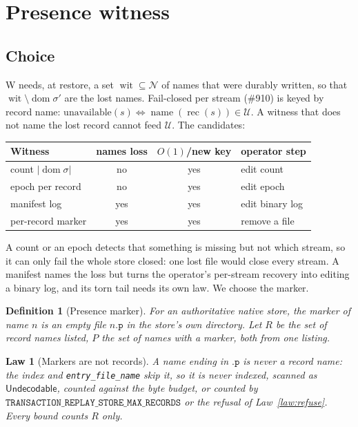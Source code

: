 \documentclass[journal]{IEEEtran}
\newtheorem{definition}{Definition}
\newtheorem{law}{Law}
\newcommand{\Nm}{\mathcal{N}}
\newcommand{\dom}{\operatorname{dom}}
\newcommand{\rec}{\operatorname{rec}}
\newcommand{\wit}{\operatorname{wit}}
\newcommand{\name}{\operatorname{name}}
\newcommand{\Undec}{\mathsf{Undecodable}}
\newcommand{\U}{\mathcal{U}}
\begin{document}
\section{Presence witness}\label{sec:witness}

\subsection{Choice}

W needs, at restore, a set $\wit\subseteq\Nm$ of names that were durably written, so that
$\wit\setminus\dom\sigma'$ are the lost names.  Fail-closed per stream (\#910) is keyed by
record name: $\mathrm{unavailable}(s)\iff\name(\rec(s))\in\U$.  A witness that does not
name the lost record cannot feed $\U$.  The candidates:

\begin{center}
\footnotesize
\begin{tabular}{@{}lccl@{}}
\toprule
Witness & names loss & $O(1)$/new key & operator step\\
\midrule
count $|\dom\sigma|$ & no & yes & edit count\\
epoch per record & no & yes & edit epoch\\
manifest log & yes & yes & edit binary log\\
per-record marker & yes & yes & remove a file\\
\bottomrule
\end{tabular}
\end{center}

A count or an epoch detects that something is missing but not which stream, so it can only
fail the whole store closed: one lost file would close every stream.  A manifest names the
loss but turns the operator's per-stream recovery into editing a binary log, and its torn
tail needs its own law.  We choose the marker.

\begin{definition}[Presence marker]\label{def:marker}
For an authoritative native store, the marker of name $n$ is an empty file $n.\mathtt{p}$ in
the store's own directory.  Let $R$ be the set of record names listed, $P$ the set of names
with a marker, both from one listing.
\end{definition}

\begin{law}[Markers are not records]\label{law:notrecord}
A name ending in $.\mathtt{p}$ is never a record name: the index and
\texttt{entry\_file\_name} skip it, so it is never indexed, scanned as $\Undec$, counted
against the byte budget, or counted by $\mathtt{TRANSACTION\_REPLAY\_STORE\_MAX\_RECORDS}$ or
the refusal of Law~\ref{law:refuse}.  Every bound counts $R$ only.
\end{law}
\end{document}
